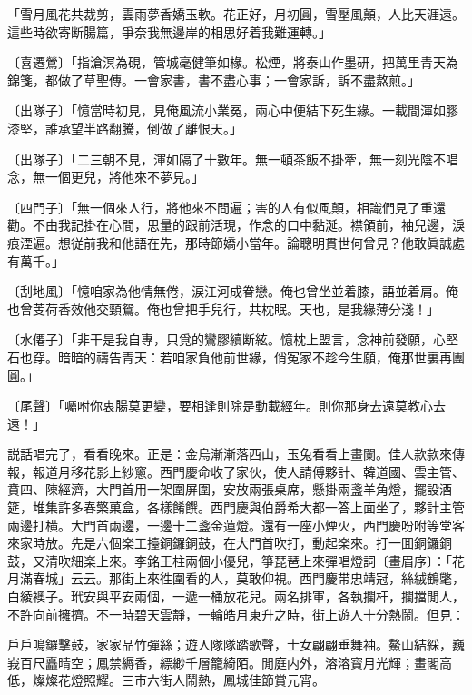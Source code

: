 \begin{myquote}
「雪月風花共裁剪，雲雨夢香嬌玉軟。花正好，月初圓，雪壓風顛，人比天涯遠。這些時欲寄断腸篇，爭奈我無邊岸的相思好着我難運轉。」

{\markfont〔喜遷鶯〕}「指滄溟為硯，管城毫健筆如椽。松煙，將泰山作墨研，把萬里青天為錦箋，都做了草聖傳。一會家書，書不盡心事；一會家訴，訴不盡熬煎。」

{\markfont〔出隊子〕}「憶當時初見，見俺風流小業冤，兩心中便結下死生緣。一載間渾如膠漆堅，誰承望半路翻騰，倒做了離恨天。」

{\markfont〔出隊子〕}「二三朝不見，渾如隔了十數年。無一頓茶飯不掛牽，無一刻光陰不唱念，無一個更兒，將他來不夢見。」

{\markfont〔四門子〕}「無一個來人行，將他來不問遍；害的人有似風顛，相識們見了重還勸。不由我記掛在心間，思量的跟前活現，作念的口中黏涎。襟領前，袖兒邊，淚痕湮遍。想従前我和他語在先，那時節嬌小當年。論聰明貫世何曾見？他敢眞誠處有萬千。」

{\markfont〔刮地風〕}「憶咱家為他情無倦，涙江河成眷戀。俺也曾坐並着膝，語並着肩。俺也曾芰荷香效他交頸鴛。俺也曾把手兒行，共枕眠。天也，是我緣薄分淺！」

{\markfont〔水僊子〕}「非干是我自專，只覓的鸞膠續断絃。憶枕上盟言，念神前發願，心堅石也穿。暗暗的禱告青天：若咱家負他前世緣，俏寃家不趁今生願，俺那世裏再團圓。」

{\markfont〔尾聲〕}「囑咐你衷腸莫更變，要相逢則除是動載經年。則你那身去遠莫教心去遠！」
\end{myquote}

説話唱完了，看看晚來。正是：金烏漸漸落西山，玉兔看看上畫闌。佳人款款來傳報，報道月移花影上紗窻。西門慶命收了家伙，使人請傅夥計、韓道國、雲主管、賁四、陳經濟，大門首用一架圍屏圍，安放兩張桌席，懸掛兩盞羊角燈，擺設酒筵，堆集許多春檠菓盒，各樣餚饌。西門慶與伯爵希大都一答上面坐了，夥計主管兩邊打横。大門首兩邊，一邊十二盞金蓮燈。還有一座小煙火，西門慶吩咐等堂客來家時放。先是六個楽工擡銅鑼銅鼓，在大門首吹打，動起楽來。打一囬銅鑼銅鼓，又清吹細楽上來。李銘王柱兩個小優兒，箏琵琶上來彈唱燈詞〔畫眉序〕：「花月滿春城」云云。那街上來徃圍看的人，莫敢仰視。西門慶带忠靖冠，絲絨鶴氅，白綾襖子。玳安與平安兩個，一遞一桶放花兒。兩名排軍，各執攔杆，攔擋閒人，不許向前擁擠。不一時碧天雲靜，一輪皓月東升之時，街上遊人十分熱鬧。但見：

\begin{myquote}
戶戶鳴鑼擊鼓，家家品竹彈絲；遊人隊隊踏歌聲，士女翩翩垂舞袖。鰲山結綵，巍峩百尺矗晴空；鳳禁縟香，縹緲千層籠綺陌。閒庭内外，溶溶寳月光輝；畫閣高低，燦燦花燈照耀。三市六街人鬧熱，鳳城佳節賞元宵。
\end{myquote}

